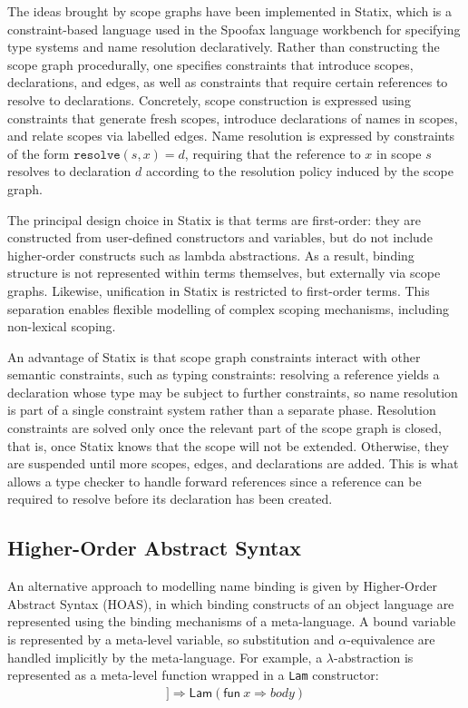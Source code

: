 The ideas brought by scope graphs have been implemented in Statix, which is a constraint-based language used in the Spoofax language workbench for
specifying type systems and name resolution declaratively. Rather than constructing the scope graph procedurally, one specifies constraints that introduce scopes, declarations, and edges, as well as constraints that require certain references to resolve to declarations. Concretely, scope construction is expressed using constraints that generate fresh scopes, introduce declarations of names in scopes, and relate scopes via labelled edges. Name resolution is expressed by constraints of the form $\texttt{resolve}(s, x) = d$, requiring that the reference to $x$ in scope $s$ resolves to declaration $d$ according to the resolution policy induced by the scope graph.

The principal design choice in Statix is that terms are first-order: they are constructed from user-defined constructors and variables, but do not include higher-order constructs such as lambda abstractions. As a result, binding structure is not represented within terms themselves, but externally via scope graphs. Likewise, unification in Statix is restricted to first-order terms.
This separation enables flexible modelling of complex scoping mechanisms, including non-lexical scoping. 

An advantage of Statix is that scope graph constraints interact with other
semantic constraints, such as typing constraints: resolving a reference yields a
declaration whose type may be subject to further constraints, so name
resolution is part of a single constraint system rather than a separate phase.
Resolution constraints are solved only once the relevant part of the scope graph
is closed, that is, once Statix knows that the scope will not be extended.
Otherwise, they are suspended until more scopes, edges, and declarations are
added. This is what allows a type checker to handle forward references since a
reference can be required to resolve before its declaration has been created.

\subsection{Higher-Order Abstract Syntax}

An alternative approach to modelling name binding is given by Higher-Order
Abstract Syntax (HOAS), in which binding constructs of an object language are
represented using the binding mechanisms of a meta-language. A bound variable is
represented by a meta-level variable, so substitution and $\alpha$-equivalence
are handled implicitly by the meta-language. For example, a
$\lambda$-abstraction is represented as a meta-level function wrapped in a
\texttt{Lam} constructor:
\begin{align*}
[\![\lambda x.\ body]\!] \Rightarrow \mathsf{Lam}(\mathsf{fun}\ x \Rightarrow body)
\end{align*}

